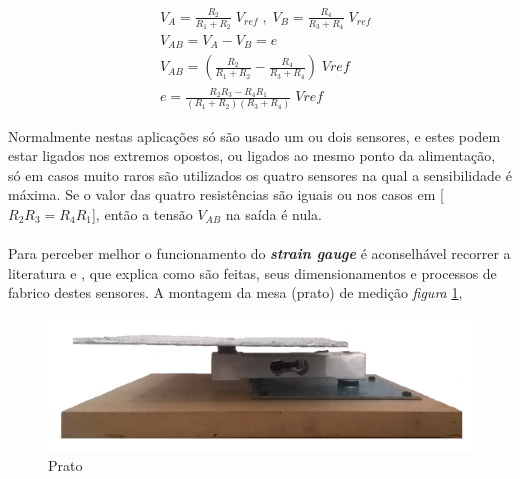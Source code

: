 \begin{minipage}[!b]{.6\linewidth}
	\begin{align}
		\label{eq:wheatstone}
		&V_A =  \frac{R_2}{R_1 + R_2} \; V_{ref} \; , \; V_B=\frac{R_4}{R_3 + R_4} \; V_{ref} \\
		&V_{AB} =  V_A - V_B = e \\
		&V_{AB}= \left(\frac{R_2}{R_1 + R_2} - \frac{R_4}{R_3 + R_4}\right) \; Vref \\
		&e = \frac{R_2 R_3 - R_4 R_1}{(R_1 + R_2)(R_3 + R_4)} \; Vref
	\end{align}
\end{minipage}
Normalmente nestas aplicações só são usado um ou dois sensores, e estes podem estar ligados nos extremos opostos, ou ligados ao mesmo ponto da alimentação, só em casos muito raros são utilizados os quatro sensores na qual a sensibilidade é máxima. Se o valor das quatro resistências são iguais ou nos casos em [$R_2 R_3 = R_4 R_1$], então a tensão $V_{AB}$ na saída é nula.
\\
\\
Para perceber melhor o funcionamento do \textit{\bf strain gauge} é aconselhável recorrer a literatura \cite{book-9} e \cite{book-10}, que explica como são feitas, seus dimensionamentos e processos de fabrico destes sensores.
\newpage
A montagem da mesa (prato) de medição  \textit{figura} \ref{Prato},
\begin{minipage}[!b]{\linewidth}
\begin{figure}[H]
	\centering
	\includegraphics[scale=0.16]{./image/PESTA/material/Prato.jpg}
	\caption{Prato}
	\label{Prato}
\end{figure}
\end{minipage}
\newpage

